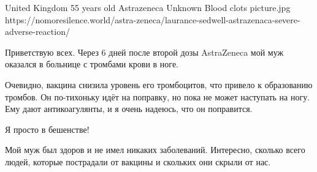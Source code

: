           {United Kingdom}
          {55 years old}
          {Astrazeneca}
          {Unknown}
          {Blood clots}
          {picture.jpg}
          {https://nomoresilence.world/astra-zeneca/laurance-sedwell-astrazenaca-severe-adverse-reaction/}
          {

Приветствую всех. Через 6 дней после второй дозы AstraZeneca мой муж оказался в больнице с тромбами крови в ноге.

Очевидно, вакцина снизила уровень его тромбоцитов, что привело к образованию тромбов. Он по-тихоньку идёт на поправку, но пока не может наступать на ногу. Ему дают антикоагулянты, и я очень надеюсь, что он поправится.

Я просто в бешенстве!

Мой муж был здоров и не имел никаких заболеваний. Интересно, сколько всего людей, которые пострадали от вакцины и скольких они скрыли от нас.

}
